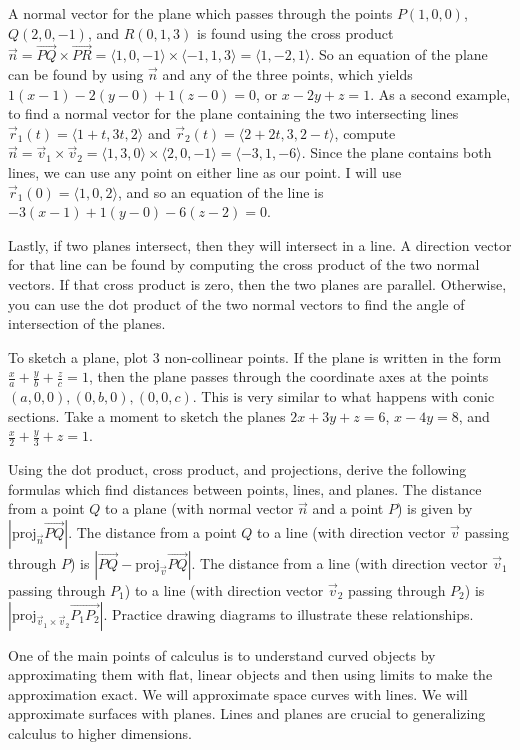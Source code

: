 A normal vector for the plane which passes through the points
$P(1,0,0)$, $Q(2,0,-1)$, and $R(0,1,3)$ is found using the cross product $\vec n
= \vec{PQ}\times \vec{PR} = \langle1,0,-1\rangle\times\langle-1,1,3\rangle =
\langle1,-2,1\rangle$.  So an equation of the plane can be found by
using $\vec n$ and any of the three points, which yields
$1(x-1)-2(y-0)+1(z-0)=0$, or $x-2y+z=1$.
As a second example, to find a normal vector for the plane containing
the two intersecting lines {$\vec r_1(t) = \langle1+t,3t,2 \rangle$}
and {$\vec r_2(t) = \langle2+2t,3,2-t \rangle$}, compute $\vec n = \vec
v_1\times \vec v_2 = \langle1,3,0\rangle \times \langle2,0,-1\rangle=\langle-3,1,-6
\rangle$. Since the plane contains both lines, we can use any point on
either line as our point.  I will use {$\vec r_1(0) = \langle1,0,2
\rangle$}, and so an equation of the line is
$-3(x-1)+1(y-0)-6(z-2)=0$.

Lastly, if two planes intersect, then they will intersect in a line. 
A direction vector for that line can be found by computing the cross
product of the two normal vectors.  If that cross product is zero,
then the two planes are parallel. Otherwise, you can use the dot
product of the two normal vectors to find the angle of intersection of
the planes.

To sketch a plane, plot 3 non-collinear points. If the plane is
written in the form {$\displaystyle\frac xa+\frac yb+\frac zc=1$},
then the plane passes through the coordinate axes at the points
$(a,0,0),(0,b,0),(0,0,c)$. This is very similar to what happens with
conic sections. Take a moment to sketch the planes {$2x+3y+z=6$},
{$x-4y=8$}, and {$\displaystyle\frac x2+\frac y3+z=1$}.

Using the dot product, cross product, and projections, derive the
following formulas which find distances between points, lines, and
planes. The distance from a point $Q$ to a plane (with normal vector
{$\vec n$} and a point $P$) is given by $|\text{proj}_{\vec n}\vec
{PQ}|$.  The distance from a point $Q$ to a line (with direction
vector $\vec v$ passing through $P$) is $|\vec{PQ}-\text{proj}_{\vec
v}\vec {PQ}|$. The distance from a line (with direction vector $\vec
v_1$ passing through $P_1$) to a line (with direction vector $\vec
v_2$ passing through $P_2$) is $|\text{proj}_{\vec v_1\times\vec v_2}\vec
{P_1P_2}|$. Practice drawing diagrams to illustrate these
relationships.


One of the main points of calculus is to understand curved objects by
approximating them with flat, linear objects and then using limits to
make the approximation exact. We will approximate space curves with
lines. We will approximate surfaces with planes.  Lines and planes are
crucial to generalizing calculus to higher dimensions.












